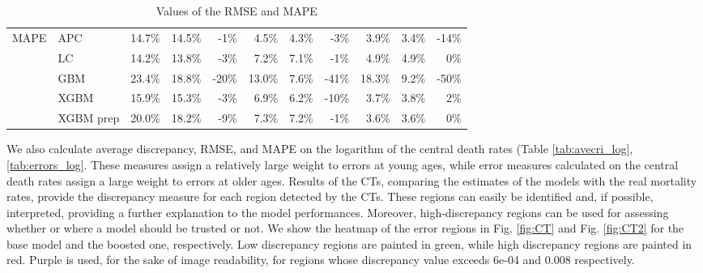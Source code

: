 \documentclass[fleqn,10pt]{wlscirep}
\begin{document}
\begin{table}[ht]
\begin{tabular}{|l|l|r|r|r|r|r|r|r|r|r|}
\hline
\multirow{5}{*}{MAPE}  & APC 			&	14.7\%	&	14.5\%	&	-1\%		&	4.5\%	&	4.3\%	&	-3\%		&	3.9\%	&	3.4\%	&	-14\% \\
& LC 			&	14.2\%	&	13.8\%	&	-3\%		&	7.2\%	&	7.1\%	&	-1\%		&	4.9\%	&	4.9\%	&	0\%	\\
& GBM 		&	23.4\%	&	18.8\%	&	-20\%	&	13.0\%	&	7.6\%	&	-41\%	&	18.3\%	&	9.2\%	&	-50\% \\
& XGBM 		&	15.9\%	&	15.3\%	&	-3\%		&	6.9\%	&	6.2\%	&	-10\%	&	3.7\%	&	3.8\%	&	2\%	\\
& XGBM prep 	&	20.0\%	&	18.2\%	&	-9\%		&	7.3\%	&	7.2\%	&	-1\%		&	3.6\%	&	3.6\%	&	0\%	\\
\hline
\end{tabular}
\caption{Values of the RMSE and MAPE}
\label{tab:errors}
\end{table}
%
\color{blue}
We also calculate average discrepancy, RMSE, and MAPE on the logarithm of the central death rates (Table \ref{tab:avecri_log}, \ref{tab:errors_log}. 
These measures assign a relatively large weight to errors at young ages, while error measures calculated on the central death rates assign a large weight to errors at older ages.
\color{black} 
Results of the CTs, comparing the estimates of the models with the real mortality rates, provide the discrepancy measure for each region detected by the CTs. %
These regions can easily be identified and, if possible, interpreted, providing a further explanation to the model performances. Moreover, high-discrepancy regions can be used for assessing whether or where a model should be trusted or not. \color{blue}We show the heatmap of the error regions in Fig. \ref{fig:CT} and Fig. \ref{fig:CT2} for the base model and the boosted one, respectively. \color{black} Low discrepancy regions are painted in green, while high discrepancy regions are painted in red. Purple is used, for the sake of image readability, for regions whose discrepancy value exceeds 6e-04 and 0.008 respectively.
\end{document}

